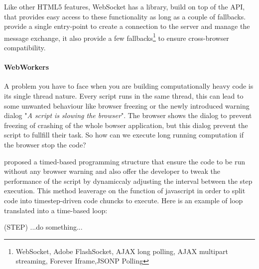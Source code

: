 	Like other HTML5 features, WebSocket has a library, build on top of the API, that provides easy access to these functionality
	as long as a couple of fallbacks.  provide a single entry-point to create a connection to the server and
	manage the message exchange, it also provide a few fallbacks\footnote{ WebSocket, Adobe\reg
	Flash\reg Socket,
	AJAX long polling, AJAX multipart streaming, Forever Iframe,JSONP Polling} to ensure cross-browser compatibility.


\paragraph{WebWorkers}
	A problem you have to face when you are building computationally heavy \js{} code is its single thread nature.
	Every script runs in the same thread, this can lead to some unwanted behaviour like browser freezing or the newly
	introduced warning dialog "\emph{A script is slowing the browser}". The browser shows the dialog to prevent freezing of crashing of the
	whole bowser application, but this dialog prevent the script to fullfill their task. So how can we execute long running
	\js{} computation if the browser stop the code?

	\cite{jenkin2008parasitic} proposed a timed-based programming structure that ensure the code to be run without any browser warning
	and also offer the developer to tweak the performance of the script by dynamiccaly adjusting the interval between the step execution.
	This method leaverage on the  function of javascript in order to split code into timestep-driven code chuncks to execute.
	Here is an example of loop translated into a time-based loop:
	\begin{multicols}{2}
		\begin{algorithm}[H]
		\end{algorithm}

		\vfill
		\columnbreak

		\begin{algorithm}[H]

			\procedure(STEP){
				...do something...\\
			}
		\end{algorithm}
	\end{multicols}


